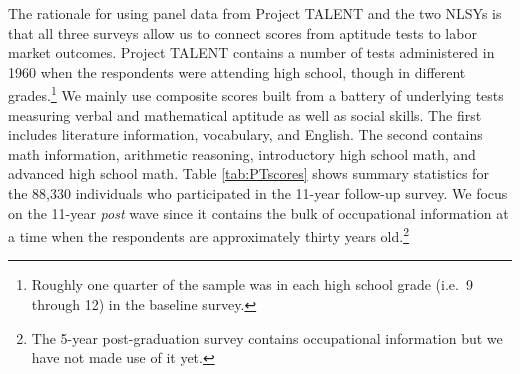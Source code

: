 \documentclass[onehalfspacing,11pt]{article}
\begin{document}
	
	The rationale for using panel data from Project TALENT and the two NLSYs is that all three surveys allow us to connect scores from aptitude tests to labor market outcomes. 
	Project TALENT contains a number of tests administered in 1960 when the respondents were attending high school, though in different grades.\footnote{Roughly one quarter of the sample was in each high school grade (i.e.~9 through 12) in the baseline survey.} We mainly use composite scores built from a battery of underlying tests measuring verbal and mathematical aptitude as well as social skills. The first includes literature information, vocabulary, and English. The second contains math information, arithmetic reasoning, introductory high school math, and advanced high school math. Table \ref{tab:PTscores} shows summary statistics for the 88,330 individuals who participated in the 11-year follow-up survey. We focus on the 11-year {\it post} wave since it contains the bulk of occupational information at a time when the respondents are approximately thirty years old.\footnote{The 5-year post-graduation survey contains occupational information but we have not made use of it yet.}
	
\end{document}

